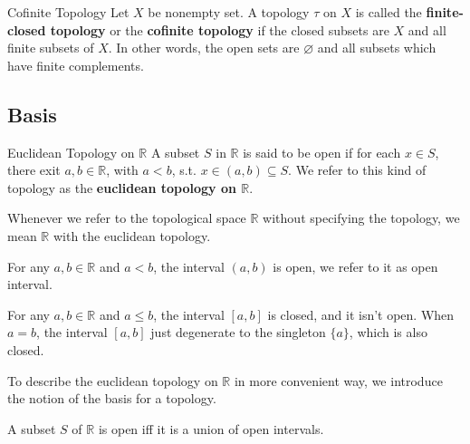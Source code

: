 \begin{definition}{Cofinite Topology}{}
    Let $X$ be nonempty set. A topology $\tau$ on $X$ is called the
    \textbf{finite-closed topology} or the \textbf{cofinite topology}
    if the closed subsets are $X$ and all finite subsets of $X$. In
    other words, the open sets are $\varnothing$ and all subsets which
    have finite complements.
\end{definition}

\subsection{Basis}\label{sub:Basis} %

\begin{definition}{Euclidean Topology on $\mathbb{R}$}{}
    A subset $S$ in $\mathbb{R}$ is said to be open if for each $x
    \in S$, there exit $a,b \in \mathbb{R}$, with $a < b$, s.t. $x
    \in (a,b) \subseteq S$. We refer to this kind of topology as the
    \textbf{euclidean topology on $\mathbb{R}$}.
\end{definition}

\begin{remarks}
    Whenever we refer to the topological space $\mathbb{R}$ without
    specifying the
    topology, we mean $\mathbb{R}$ with the euclidean topology.
\end{remarks}

\begin{example}
    For any $a,b \in \mathbb{R}$ and $a<b$, the interval $(a,b)$ is
    open, we refer to it as open interval.
\end{example}

\begin{example}
    For any $a,b \in \mathbb{R}$ and $a \le b$, the interval $[a,b]$ is closed,
    and it isn't open. When $a = b$, the interval $[a,b]$ just
    degenerate to the singleton $\{a\}$, which is also closed.
\end{example}

To describe the euclidean topology on $\mathbb{R}$ in more convenient
way, we introduce the notion of the basis for a topology.

\begin{proposition}{}{}
    \label{pro:open intervals}
    A subset $S$ of $\mathbb{R}$ is open iff it is a union of open intervals.
\end{proposition}


